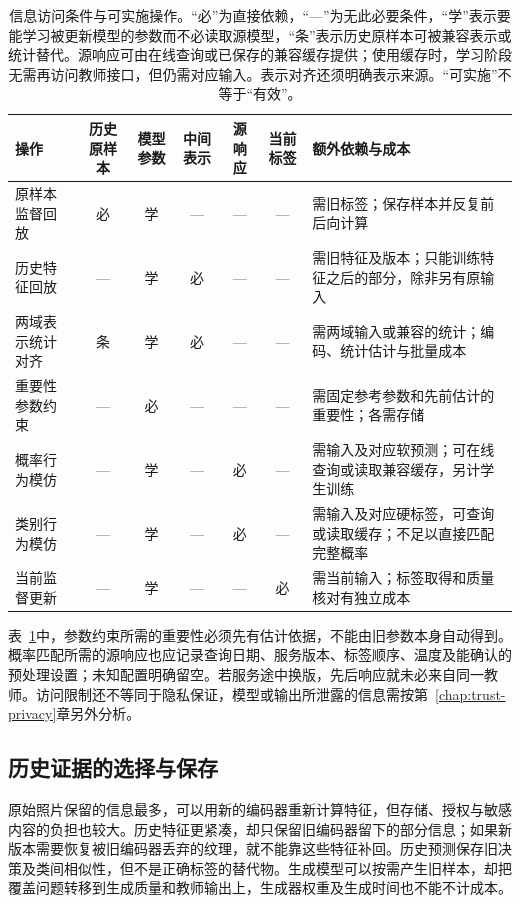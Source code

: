 \begin{table}[htbp]
\small
\begin{tabularx}{\linewidth}{@{}p{26mm}cccccX@{}}
\toprule
操作 & 历史原样本 & 模型参数 & 中间表示 & 源响应 & 当前标签 & 额外依赖与成本 \\
\midrule
原样本监督回放 & 必 & 学 & — & — & — & 需旧标签；保存样本并反复前后向计算 \\
历史特征回放 & — & 学 & 必 & — & — & 需旧特征及版本；只能训练特征之后的部分，除非另有原输入 \\
两域表示统计对齐 & 条 & 学 & 必 & — & — & 需两域输入或兼容的统计；编码、统计估计与批量成本 \\
重要性参数约束 & — & 必 & — & — & — & 需固定参考参数和先前估计的重要性；各需存储 \\
概率行为模仿 & — & 学 & — & 必 & — & 需输入及对应软预测；可在线查询或读取兼容缓存，另计学生训练 \\
类别行为模仿 & — & 学 & — & 必 & — & 需输入及对应硬标签，可查询或读取缓存；不足以直接匹配完整概率 \\
当前监督更新 & — & 学 & — & — & 必 & 需当前输入；标签取得和质量核对有独立成本 \\
\bottomrule
\end{tabularx}
\caption{信息访问条件与可实施操作。“必”为直接依赖，“—”为无此必要条件，“学”表示要能学习被更新模型的参数而不必读取源模型，“条”表示历史原样本可被兼容表示或统计替代。源响应可由在线查询或已保存的兼容缓存提供；使用缓存时，学习阶段无需再访问教师接口，但仍需对应输入。表示对齐还须明确表示来源。“可实施”不等于“有效”。}
\label{tab:ket-update-access}
\end{table}

表~\ref{tab:ket-update-access}中，参数约束所需的重要性必须先有估计依据，不能由旧参数本身自动得到。概率匹配所需的源响应也应记录查询日期、服务版本、标签顺序、温度及能确认的预处理设置；未知配置明确留空。若服务途中换版，先后响应就未必来自同一教师。访问限制还不等同于隐私保证，模型或输出所泄露的信息需按第~\ref{chap:trust-privacy}章另外分析。

\subsection{历史证据的选择与保存}
\label{sec:ket-update-memory}

原始照片保留的信息最多，可以用新的编码器重新计算特征，但存储、授权与敏感内容的负担也较大。历史特征更紧凑，却只保留旧编码器留下的部分信息；如果新版本需要恢复被旧编码器丢弃的纹理，就不能靠这些特征补回。历史预测保存旧决策及类间相似性，但不是正确标签的替代物。生成模型可以按需产生旧样本，却把覆盖问题转移到生成质量和教师输出上，生成器权重及生成时间也不能不计成本。

